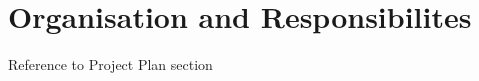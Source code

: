
\chapter{Organisation and Responsibilites} %

\label{Part4Chapter4} %


Reference to Project Plan section